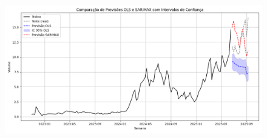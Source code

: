 \documentclass{article}
\begin{document}
\begin{figure}[h]
    \centering
    \includegraphics[width=0.75\linewidth]{images/forecast_comparison.png}
\end{figure}
\end{document}
